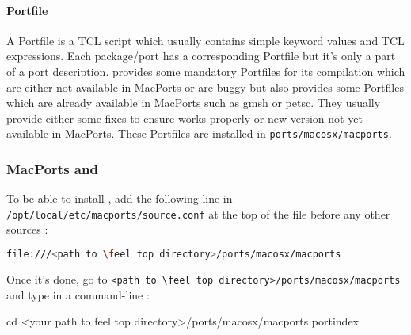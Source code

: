 \paragraph{Portfile}
A Portfile is a TCL script which usually contains simple keyword values and TCL expressions. Each package/port has a corresponding Portfile but it's only a part of a port description.
\feel provides some mandatory Portfiles for its compilation which are either not available in MacPorts or are buggy but \feel also provides some Portfiles which are already available in MacPorts such as gmsh or petsc. They usually provide either some fixes to ensure \feel works properly or new version not yet available in MacPorts.
These Portfiles are installed in \verb|ports/macosx/macports|.


\subsubsection{MacPorts and \Feel}


To be able to install \feel, add the following line in \verb|/opt/local/etc/macports/source.conf|
at the top of the file before any other sources :
\begin{lstlisting}[language=sh]
file:///<path to \feel top directory>/ports/macosx/macports
\end{lstlisting}

Once it's done, go to \verb|<path to \feel top directory>/ports/macosx/macports| and type in a command-line :
\begin{unixcom}
		cd <your path to feel top directory>/ports/macosx/macports
		portindex
\end{unixcom}

